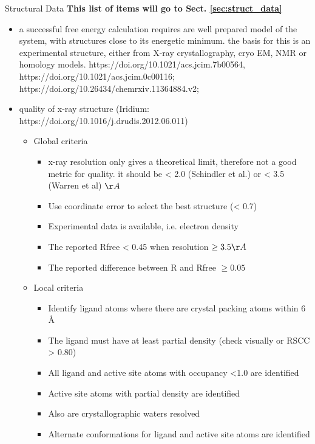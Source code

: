 \documentclass[9pt,bestpractices]{livecoms}
\begin{document}
\begin{Checklists*}[p!]

\begin{checklist}{Structural Data}
\textbf{This list of items will go to Sect. \ref{sec:struct_data}}
\begin{itemize}
\item a successful free energy calculation requires are well prepared model of the system, with structures close to its energetic minimum. the basis for this is an experimental structure, either from X-ray crystallography, cryo EM, NMR or homology models. https://doi.org/10.1021/acs.jcim.7b00564, https://doi.org/10.1021/acs.jcim.0c00116; https://doi.org/10.26434/chemrxiv.11364884.v2; 
\item quality of x-ray structure  (Iridium: https://doi.org/10.1016/j.drudis.2012.06.011)
    \begin{itemize}
    \item Global criteria
        \begin{itemize}
        \item x-ray resolution only gives a theoretical limit, therefore not a good metric for quality. it should be < 2.0 (Schindler et al.) or < 3.5 (Warren et al) $\AA$
        \item Use coordinate error to select the best structure (< 0.7)
        \item Experimental data is available, i.e. electron density
        \item The reported Rfree < 0.45 when resolution $\ge 3.5 \AA$
        \item The reported difference between R and Rfree $\ge 0.05$
        \end{itemize}
    \item Local criteria
        \begin{itemize}
        \item Identify ligand atoms where there are crystal packing atoms within 6 Å
        \item The ligand must have at least partial density (check visually or RSCC > 0.80)
        \item All ligand and active site atoms with occupancy <1.0 are identified
        \item Active site atoms with partial density are identified
        \item Also are crystallographic waters resolved
        \item Alternate conformations for ligand and active site atoms are identified

\end{itemize}
\end{itemize}
\end{itemize}
\end{checklist}
\end{Checklists*}
\end{document}
